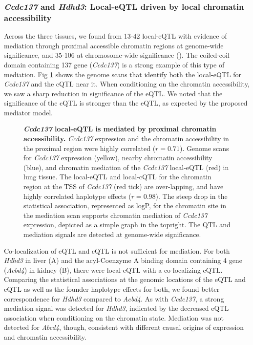 \documentclass[10pt,letterpaper]{article}
\begin{document}
\subsubsection*{\textit{Ccdc137} and \textit{Hdhd3}: Local-eQTL driven by local chromatin accessibility}
Across the three tissues, we found from 13-42 local-eQTL with evidence of mediation through proximal accessible chromatin regions at genome-wide significance, and 35-106 at chromosome-wide significance (). The coiled-coil domain containing 137 gene (\textit{Ccdc137}) is a strong example of this type of mediation. Fig \ref{fig:ccdc137_mediation} shows the genome scans that identify both the local-eQTL for \textit{Ccdc137} and the cQTL near it. 
When conditioning on the chromatin accessibility, we saw a sharp reduction in significance of the eQTL. We noted that the significance of the cQTL is stronger than the eQTL, as expected by the proposed mediator model. 

\begin{figure}[h!]
\caption{\textbf{\textit{Ccdc137} local-eQTL is mediated by proximal chromatin accessibility.} \textit{Ccdc137} expression and the chromatin accessibility in the proximal region were highly correlated ($r = 0.71$). Genome scans for \textit{Ccdc137} expression (yellow), nearby chromatin accessibility (blue), and chromatin mediation of the \textit{Ccdc137} local-eQTL (red) in lung tissue. The local-eQTL and local-cQTL for the chromatin region at the TSS of \textit{Ccdc137} (red tick) are over-lapping, and have highly correlated haplotype effects ($r = 0.98$). The steep drop in the statistical association, represented as logP, for the chromatin site in the mediation scan supports chromatin mediation of \textit{Ccdc137} expression, depicted as a simple graph in the topright. The QTL and mediation signals are detected at genome-wide significance. \label{fig:ccdc137_mediation}}
\end{figure}

Co-localization of eQTL and cQTL is not sufficient for mediation. For both \textit{Hdhd3} in liver (A) and the acyl-Coenzyme A binding domain containing 4 gene (\textit{Acbd4}) in kidney (B), there were local-eQTL with a co-localizing cQTL. Comparing the statistical associations at the genomic locations of the eQTL and cQTL as well as the founder haplotype effects for both, we found better correspondence for \textit{Hdhd3} compared to \textit{Acbd4}. As with \textit{Ccdc137}, a strong mediation signal was detected for \textit{Hdhd3}, indicated by the decreased eQTL association when conditioning on the chromatin state. Mediation was not detected for \textit{Abcd4}, though, consistent with different causal origins of expression and chromatin accessibility.
\end{document}
